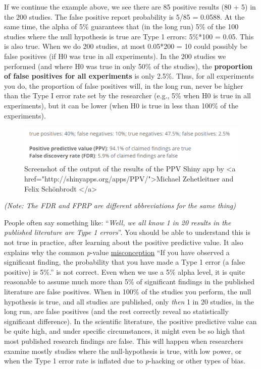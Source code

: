 \documentclass[
]{krantz}
\begin{document}
If we continue the example above, we see there are 85 positive results (80 + 5) in the 200 studies. The false positive report probability is 5/85 = 0.0588. At the same time, the alpha of 5\% guarantees that (in the long run) 5\% of the 100 studies where the null hypothesis is true are Type 1 errors: 5\%*100 = 0.05. This is also true. When we do 200 studies, at most 0.05*200 = 10 could possibly be false positives (if H0 was true in all experiments). In the 200 studies we performed (and where H0 was true in only 50\% of the studies), the \textbf{proportion of false positives for all experiments} is only 2.5\%. Thus, for all experiments you do, the proportion of false positives will, in the long run, never be higher than the Type I error rate set by the researcher (e.g., 5\% when H0 is true in all experiments), but it can be lower (when H0 is true in less than 100\% of the experiments).

\begin{figure}

{\centering \includegraphics[width=1\linewidth]{images/PPVexample} 

}

\caption{Screenshot of the output of the results of the PPV Shiny app by <a href="http://shinyapps.org/apps/PPV/">Michael Zehetleitner and Felix Schönbrodt </a>}\label{fig:ppvexample}
\end{figure}

\emph{(Note: The FDR and FPRP are different abbreviations for the same thing)}

People often say something like: ``\emph{Well, we all know 1 in 20 results in the published literature are Type 1 errors}''. You should be able to understand this is not true in practice, after learning about the positive predictive value. It also explains why the common \emph{p}-value \protect\hyperlink{misconception4}{misconception} ``If you have observed a significant finding, the probability that you have made a Type 1 error (a false positive) is 5\%.'' is not correct. Even when we use a 5\% alpha level, it is quite reasonable to assume much more than 5\% of significant findings in the published literature are false positives. When in 100\% of the studies you perform, the null hypothesis is true, and all studies are published, only \emph{then} 1 in 20 studies, in the long run, are false positives (and the rest correctly reveal no statistically significant difference). In the scientific literature, the positive predictive value can be quite high, and under specific circumstances, it might even be so high that most published research findings are false. This will happen when researchers examine mostly studies where the null-hypothesis is true, with low power, or when the Type 1 error rate is inflated due to \emph{p}-hacking or other types of bias.
\end{document}
